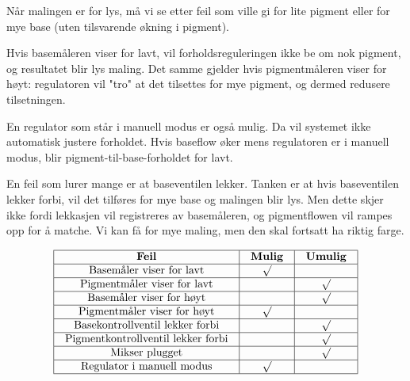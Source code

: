 
Når malingen er for lys, må vi se etter feil som ville gi for lite pigment eller for mye base (uten tilsvarende økning i pigment).

\vskip 10pt

Hvis basemåleren viser for lavt, vil forholdsreguleringen ikke be om nok pigment, og resultatet blir lys maling.  Det samme gjelder hvis pigmentmåleren viser for høyt: regulatoren vil "tro" at det tilsettes for mye pigment, og dermed redusere tilsetningen.

\vskip 10pt

En regulator som står i manuell modus er også mulig.  Da vil systemet ikke automatisk justere forholdet.  Hvis baseflow øker mens regulatoren er i manuell modus, blir pigment-til-base-forholdet for lavt.

\vskip 10pt

En feil som lurer mange er at baseventilen lekker.  Tanken er at hvis baseventilen lekker forbi, vil det tilføres for mye base og malingen blir lys.  Men dette skjer ikke fordi lekkasjen vil registreres av basemåleren, og pigmentflowen vil rampes opp for å matche.  Vi kan få for mye maling, men den skal fortsatt ha riktig farge.




$$\vbox{\offinterlineskip
\halign{\strut
\vrule \quad\hfil # \ \hfil & 
\vrule \quad\hfil # \ \hfil & 
\vrule \quad\hfil # \ \hfil \vrule \cr
\noalign{\hrule}
%
{\bf Feil} & {\bf Mulig} & {\bf Umulig} \cr
%
\noalign{\hrule}
%
Basemåler viser for lavt & $\surd$ &  \cr
%
\noalign{\hrule}
%
Pigmentmåler viser for lavt &  & $\surd$ \cr
%
\noalign{\hrule}
%
Basemåler viser for høyt &  & $\surd$ \cr
%
\noalign{\hrule}
%
Pigmentmåler viser for høyt & $\surd$ &  \cr
%
\noalign{\hrule}
%
Basekontrollventil lekker forbi &  & $\surd$ \cr
%
\noalign{\hrule}
%
Pigmentkontrollventil lekker forbi &  & $\surd$ \cr
%
\noalign{\hrule}
%
Mikser plugget &  & $\surd$ \cr
%
\noalign{\hrule}
%
Regulator i manuell modus & $\surd$ &  \cr
%
\noalign{\hrule}
} %
}$$ %



